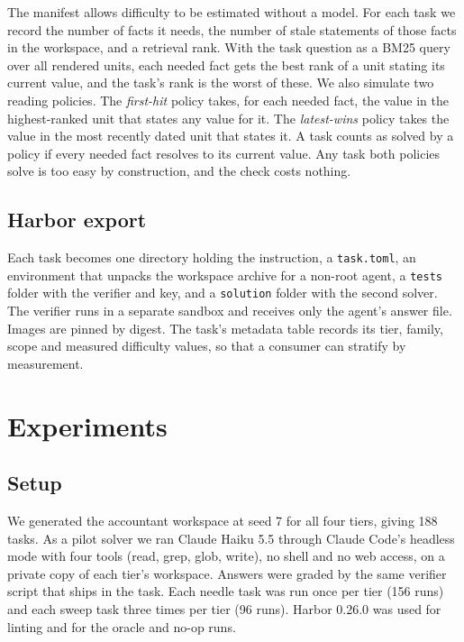 \documentclass{article}
\newcommand{\code}[1]{\texttt{\small #1}}
\begin{document}
The manifest allows difficulty to be estimated without a model. For each task we record the number of facts it needs, the number of stale statements of those facts in the workspace, and a retrieval rank. With the task question as a BM25 query over all rendered units, each needed fact gets the best rank of a unit stating its current value, and the task's rank is the worst of these. We also simulate two reading policies. The \emph{first-hit} policy takes, for each needed fact, the value in the highest-ranked unit that states any value for it. The \emph{latest-wins} policy takes the value in the most recently dated unit that states it. A task counts as solved by a policy if every needed fact resolves to its current value. Any task both policies solve is too easy by construction, and the check costs nothing.

\subsection{Harbor export}

Each task becomes one directory holding the instruction, a \code{task.toml}, an environment that unpacks the workspace archive for a non-root agent, a \code{tests} folder with the verifier and key, and a \code{solution} folder with the second solver. The verifier runs in a separate sandbox and receives only the agent's answer file. Images are pinned by digest. The task's metadata table records its tier, family, scope and measured difficulty values, so that a consumer can stratify by measurement.

\section{Experiments}
\label{sec:results}

\subsection{Setup}

We generated the accountant workspace at seed 7 for all four tiers, giving 188 tasks. As a pilot solver we ran Claude Haiku 5.5 through Claude Code's headless mode with four tools (read, grep, glob, write), no shell and no web access, on a private copy of each tier's workspace. Answers were graded by the same verifier script that ships in the task. Each needle task was run once per tier (156 runs) and each sweep task three times per tier (96 runs). Harbor 0.26.0 was used for linting and for the oracle and no-op runs.
\end{document}
